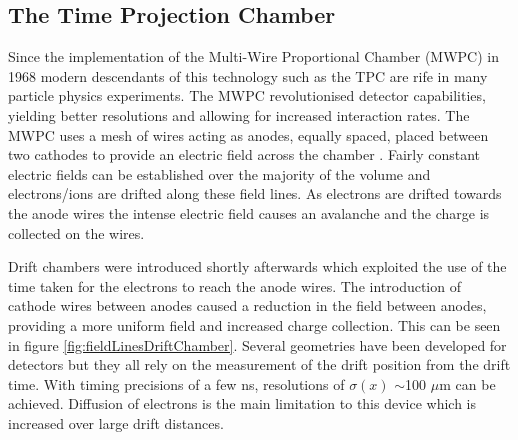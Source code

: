 
\subsection{The Time Projection Chamber}
Since the implementation of the Multi-Wire Proportional Chamber (MWPC) in 1968 \cite{mwpcCharpak} modern descendants of this technology such as the TPC are rife in many particle physics experiments. The MWPC revolutionised detector capabilities, yielding better resolutions and allowing for increased interaction rates. The MWPC uses a mesh of wires acting as anodes, equally spaced, placed between two cathodes to provide an electric field across the chamber \cite{radiationLengthsBook}. Fairly constant electric fields can be established over the majority of the volume and electrons/ions are drifted along these field lines. As electrons are drifted towards the anode wires the intense electric field causes an avalanche and the charge is collected on the wires. 

Drift chambers were introduced shortly afterwards which exploited the use of the time taken for the electrons to reach the anode wires. The introduction of cathode wires between anodes caused a reduction in the field between anodes, providing a more uniform field and increased charge collection. This can be seen in figure \ref{fig:fieldLinesDriftChamber}. Several geometries have been developed for detectors but they all rely on the measurement of the drift position from the drift time. With timing precisions of a few ns, resolutions of $\sigma(x)$ $\sim$100 $\mu$m can be achieved. Diffusion of electrons is the main limitation to this device which is increased over large drift distances. 


